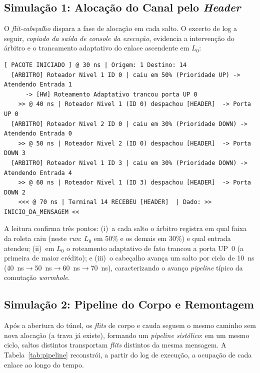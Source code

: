 \documentclass[conference]{IEEEtran}
\begin{document}
\subsection{Simulação 1: Alocação do Canal pelo \emph{Header}}
O \emph{flit-cabeçalho} dispara a fase de alocação em cada salto. O excerto de
log a seguir, \emph{copiado da saída de console da execução}, evidencia a
intervenção do árbitro e o trancamento adaptativo do enlace ascendente em $L_0$:

\noindent\begin{minipage}{\columnwidth}
\begin{lstlisting}[style=log]
[ PACOTE INICIADO ] @ 30 ns | Origem: 1 Destino: 14
  [ARBITRO] Roteador Nivel 1 ID 0 | caiu em 50% (Prioridade UP) -> Atendendo Entrada 1
      -> [HW] Roteamento Adaptativo trancou porta UP 0
    >> @ 40 ns | Roteador Nivel 1 (ID 0) despachou [HEADER]  -> Porta UP 0
  [ARBITRO] Roteador Nivel 2 ID 0 | caiu em 30% (Prioridade DOWN) -> Atendendo Entrada 0
    >> @ 50 ns | Roteador Nivel 2 (ID 0) despachou [HEADER]  -> Porta DOWN 3
  [ARBITRO] Roteador Nivel 1 ID 3 | caiu em 30% (Prioridade DOWN) -> Atendendo Entrada 4
    >> @ 60 ns | Roteador Nivel 1 (ID 3) despachou [HEADER]  -> Porta DOWN 2
    <<< @ 70 ns | Terminal 14 RECEBEU [HEADER]  | Dado: >> INICIO_DA_MENSAGEM <<
\end{lstlisting}
\end{minipage}

A leitura confirma três pontos: (i)~a cada salto o árbitro registra em qual faixa
da roleta caiu (neste \emph{run}: $L_0$ em 50\% e os demais em 30\%) e qual
entrada atendeu; (ii)~em $L_0$ o roteamento adaptativo de fato trancou a porta
UP~0 (a primeira de maior crédito); e (iii)~o cabeçalho avança um salto por ciclo
de \SI{10}{ns} (\SI{40}{ns}$\to$\SI{50}{ns}$\to$\SI{60}{ns}$\to$\SI{70}{ns}),
caracterizando o avanço \emph{pipeline} típico da comutação \emph{wormhole}.

\subsection{Simulação 2: Pipeline do Corpo e Remontagem}
Após a abertura do túnel, os \emph{flits} de corpo e cauda seguem o mesmo caminho
sem nova alocação (a trava já existe), formando um \emph{pipeline sistólico}: em
um mesmo ciclo, saltos distintos transportam \emph{flits} distintos da mesma
mensagem. A Tabela~\ref{tab:pipeline} reconstrói, a partir do log de execução, a
ocupação de cada enlace ao longo do tempo.
\end{document}
